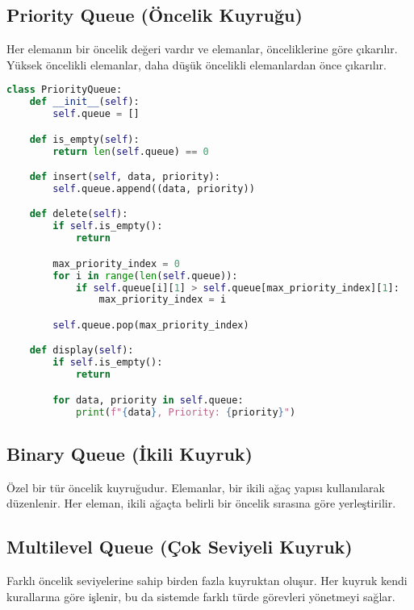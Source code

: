 \newpage

\subsection{Priority Queue (Öncelik Kuyruğu)}

Her elemanın bir öncelik değeri vardır ve elemanlar, önceliklerine göre çıkarılır. Yüksek öncelikli elemanlar, daha düşük öncelikli elemanlardan önce çıkarılır.

\begin{lstlisting}[language=Python]
class PriorityQueue:
    def __init__(self):
        self.queue = []

    def is_empty(self):
        return len(self.queue) == 0

    def insert(self, data, priority):
        self.queue.append((data, priority))

    def delete(self):
        if self.is_empty():
            return

        max_priority_index = 0
        for i in range(len(self.queue)):
            if self.queue[i][1] > self.queue[max_priority_index][1]:
                max_priority_index = i

        self.queue.pop(max_priority_index)

    def display(self):
        if self.is_empty():
            return

        for data, priority in self.queue:
            print(f"{data}, Priority: {priority}")
\end{lstlisting}

\newpage

\subsection{Binary Queue (İkili Kuyruk)}

Özel bir tür öncelik kuyruğudur. Elemanlar, bir ikili ağaç yapısı kullanılarak düzenlenir. Her eleman, ikili ağaçta belirli bir öncelik sırasına göre yerleştirilir.

\newpage

\subsection{Multilevel Queue (Çok Seviyeli Kuyruk)}

Farklı öncelik seviyelerine sahip birden fazla kuyruktan oluşur. Her kuyruk kendi kurallarına göre işlenir, bu da sistemde farklı türde görevleri yönetmeyi sağlar.

